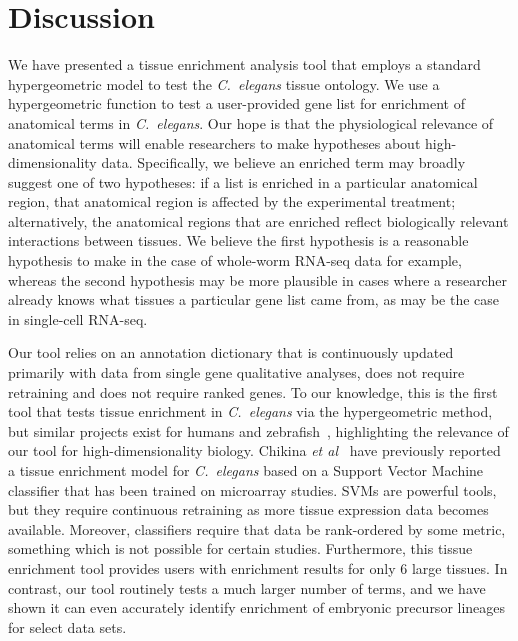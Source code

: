 \documentclass{bmcart}
\begin{document}
\section*{Discussion}
We have presented a tissue enrichment analysis tool that employs a standard hypergeometric model to test the \emph{C.~elegans} tissue ontology. We use a hypergeometric function to test a user-provided gene list for enrichment of anatomical terms in \emph{C.~elegans}. Our hope is that the physiological relevance of anatomical terms will enable researchers to make hypotheses about high-dimensionality data. Specifically, we believe an enriched term may broadly suggest one of two hypotheses: if a list is enriched in a particular anatomical region, that anatomical region is affected by the experimental treatment; alternatively, the anatomical regions that are enriched reflect biologically relevant interactions between tissues. We believe the first hypothesis is a reasonable hypothesis to make in the case of whole-worm RNA-seq data for example, whereas the second hypothesis may be more plausible in cases where a researcher already knows what tissues a particular gene list came from, as may be the case in single-cell RNA-seq. 

Our tool relies on an annotation dictionary that is continuously updated primarily with data from single gene qualitative analyses, does not require retraining and does not require ranked genes. To our knowledge, this is the first tool that tests tissue enrichment  in \emph{C.~elegans} via the hypergeometric method, but similar projects exist for humans and zebrafish~\cite{Lee2013, Prykhozhij2013}, highlighting the relevance of our tool for high-dimensionality biology. Chikina \emph{et al}~\cite{Chikina2009} have previously reported a tissue enrichment model for \emph{C.~elegans }based on a Support Vector Machine classifier that has been trained on microarray studies. SVMs are powerful tools, but they require continuous retraining as more tissue expression data becomes available. Moreover, classifiers require that data be rank-ordered by some metric, something which is not possible for certain studies. Furthermore, this tissue enrichment tool provides users with enrichment results for only 6 large tissues. In contrast, our tool routinely tests a much larger number of terms, and we have shown it can even accurately identify enrichment of embryonic precursor lineages for select data sets. 
\end{document}
